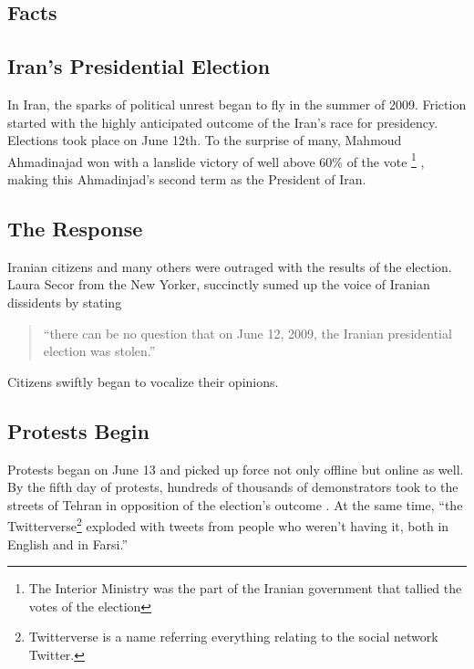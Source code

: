 \documentclass[11pt]{article}
\begin{document}
\begin{multicols}{2}
\setcounter{page}{1}
\section{Facts} 

\subsection{Iran's Presidential Election}

In Iran, the sparks of political unrest began to fly in the summer of 2009.
Friction started with the highly anticipated outcome of the Iran's race for
presidency. Elections took place on June 12th. To the surprise of many, Mahmoud
Ahmadinajad won with a lanslide victory of well above 60\% of the vote
\footnote{The Interior Ministry was the part of the Iranian government that
tallied the votes of the election}  \cite{TheIranianVote,
IranianElectionResultsByProvince} , making this Ahmadinjad's second term as the
President of Iran.

\subsection{The Response}

Iranian citizens and many others were outraged with the results of the election.
Laura Secor from the New Yorker, succinctly sumed up the voice of Iranian
dissidents by stating 
\begin{quotation} 
  ``there can be no question that on June 12, 2009, the Iranian presidential 
  election was stolen.'' \cite{TheIranianVote}
\end{quotation} 
Citizens swiftly began to vocalize their opinions.

\subsection{Protests Begin}

Protests began on June 13 and picked up force not only offline but online as
well. By the fifth day of protests, hundreds of thousands of demonstrators took to
the streets of Tehran in opposition of the election's outcome
\cite{IranProtestsFifthDayOfUnrest}. At the same time, ``the
Twitterverse\footnote{Twitterverse is a name referring everything relating to
the social network Twitter.} exploded with tweets from people who weren't having
it, both in English and in Farsi.'' \cite{WhyTwitterIsTheMedium}


\end{multicols}
\end{document}

